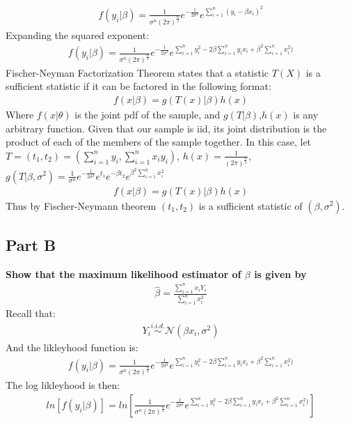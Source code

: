 \documentclass{article}
\begin{document}
\begin{align*}
f(y_i|\beta) = \frac{1}{\sigma^n (2 \pi)^{\frac{n}{2}}} e^{-\frac{1}{2\sigma^2}} e^{\sum_{i=1}^{n}(y_i - \beta x_i)^2}
\end{align*}
Expanding the squared exponent:
\begin{align*}
f(y_i|\beta) = \frac{1}{\sigma^n (2 \pi)^{\frac{n}{2}}} e^{-\frac{1}{2\sigma^2}} e^{\sum_{i=1}^{n}y_i^2 - 2 \beta \sum_{i=1}^{n} y_i x_i + \beta^2 \sum_{i=1}^{n} x_i^2)}
\end{align*}
Fischer-Neyman Factorization Theorem states that a statistic $T(X)$ is a sufficient statistic if it can be factored in the following format:
\begin{align*}
f(x|\beta) = g(T(x)|\beta)h(x)
\end{align*}
Where $f(x|\theta)$ is the joint pdf of the sample, and $g(T|\beta)$,$h(x)$ is any arbitrary function. Given that our sample is iid, its joint distribution is the product of each of the members of the sample together.
In this case, let $T=(t_1,t_2)=(\sum_{i=1}^{n}y_i, \sum_{i=1}^{n}x_i y_i)$, $h(x)=\frac{1}{(2\pi)^{\frac{n}{2}}} $, $g(T|\beta,\sigma^2) = \frac{1}{\sigma^n} e^{-\frac{1}{2 \sigma^2}} e^{t_1} e^{-\beta t_2} e^{\beta^2 \sum_{i=1}^{n} x_i^2}$
\begin{align*}
f(x|\beta) = g(T(x)|\beta)h(x)
\end{align*}
Thus by Fischer-Neymann theorem $(t_1, t_2)$ is a sufficient statistic of $(\beta,\sigma^2)$.


\subsection*{Part B}
\textbf{Show that the maximum likelihood estimator of $\beta$ is given by}
\begin{align*}
\hat{\beta} = \frac{\sum_{i=1}^{n} x_i Y_i}{\sum_{i=1}^{n} x_i^2}
\end{align*}
Recall that:
\begin{align*}
Y_i \overset{i.i.d.}{\sim} \mathcal{N}(\beta x_i, \sigma^2)
\end{align*}
And the likleyhood function is:
\begin{align*}
f(y_i|\beta) = \frac{1}{\sigma^n (2 \pi)^{\frac{n}{2}}} e^{-\frac{1}{2\sigma^2}} e^{\sum_{i=1}^{n}y_i^2 - 2 \beta \sum_{i=1}^{n} y_i x_i + \beta^2 \sum_{i=1}^{n} x_i^2)}
\end{align*}
The log likleyhood is then:
\begin{align*}
ln[f(y_i|\beta)] = ln[ \frac{1}{\sigma^n (2 \pi)^{\frac{n}{2}}} e^{-\frac{1}{2\sigma^2}} e^{\sum_{i=1}^{n}y_i^2 - 2 \beta \sum_{i=1}^{n} y_i x_i + \beta^2 \sum_{i=1}^{n} x_i^2)} ]
\end{align*}
\end{document}

